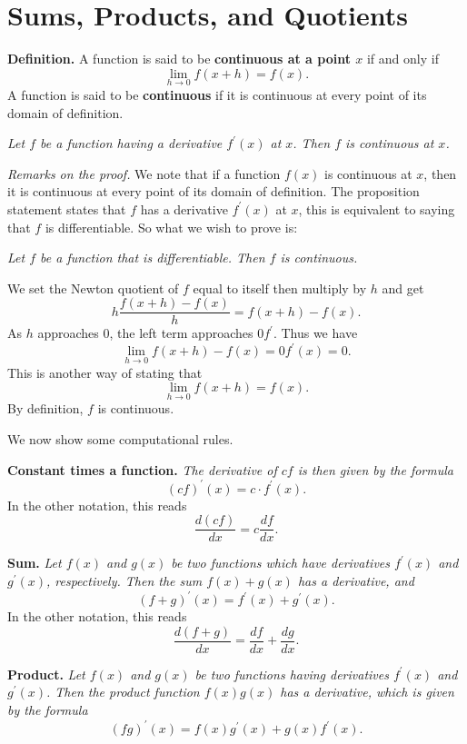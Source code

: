 \section*{Sums, Products, and Quotients}

\textbf{Definition.} A function is said to be \textbf{continuous at a point $x$} if and only if
\[\lim_{h\to0} f(x + h) = f(x).\]
A function is said to be \textbf{continuous} if it is continuous at every point of its domain of definition.

\begin{center}
\textit{Let $f$ be a function having a derivative $f^\prime(x)$ at $x$. Then $f$ is continuous at $x$.}
\end{center}

\textit{Remarks on the proof.}
We note that if a function $f(x)$ is continuous at $x$, then it is continuous at every point of its domain of
definition.
The proposition statement states that $f$ has a derivative $f^\prime(x)$ at $x$, this is equivalent to saying that
$f$ is differentiable. So what we wish to prove is:

\begin{center}
\textit{Let $f$ be a function that is differentiable. Then $f$ is continuous.}
\end{center}

We set the Newton quotient of $f$ equal to itself then multiply by $h$ and get
\[h \frac{f(x + h) - f(x)}{h} = f(x + h) - f(x).\]
As $h$ approaches 0, the left term approaches $0f^\prime$. Thus we have
\[\lim_{h\to0} f(x + h) - f(x) = 0f^\prime(x) = 0.\]
This is another way of stating that
\[\lim_{h\to0} f(x + h) = f(x).\]
By definition, $f$ is continuous.

We now show some computational rules.

\textbf{Constant times a function.} \textit{The derivative of $cf$ is then given by the formula}
\[(cf)^\prime(x) = c \cdot f^\prime(x).\]
In the other notation, this reads
\[\frac{d(cf)}{dx} = c \frac{df}{dx}.\]

\textbf{Sum.} \textit{Let $f(x)$ and $g(x)$ be two functions which have derivatives $f^\prime(x)$ and $g^\prime(x)$,
  respectively. Then the sum $f(x) + g(x)$ has a derivative, and}
\[(f + g)^\prime(x) = f^\prime(x) + g^\prime(x).\]
In the other notation, this reads
\[\frac{d(f + g)}{dx} = \frac{df}{dx} + \frac{dg}{dx}.\]

\textbf{Product.} \textit{Let $f(x)$ and $g(x)$ be two functions having derivatives $f^\prime(x)$ and $g^\prime(x)$.
  Then the product function $f(x)g(x)$ has a derivative, which is given by the formula}
\[(fg)^\prime(x) = f(x)g^\prime(x) + g(x)f^\prime(x).\]
